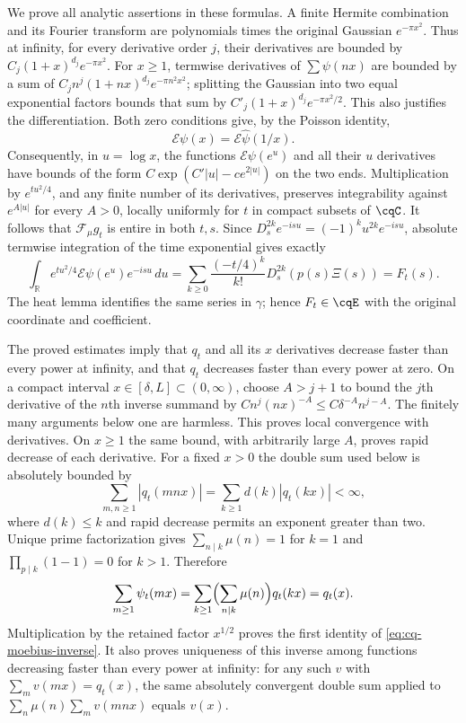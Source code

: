 We prove all analytic assertions in these formulas. A finite Hermite
combination and its Fourier transform are polynomials times the
original Gaussian $e^{-\pi x^2}$. Thus at infinity, for every
derivative order $j$, their derivatives are bounded by
$C_j(1+x)^{d_j}e^{-\pi x^2}$. For $x\geq1$, termwise derivatives
of $\sum\psi(nx)$ are bounded by a sum of
$C_j n^j(1+nx)^{d_j}e^{-\pi n^2x^2}$; splitting the Gaussian
into two equal exponential factors bounds that sum by
$C'_j(1+x)^{d_j}e^{-\pi x^2/2}$. This also justifies the
differentiation. Both zero conditions give, by the Poisson identity,
\[
 \mathcal E\psi(x)=\mathcal E\widehat\psi(1/x).
\]
Consequently, in $u=\log x$, the functions
$\mathcal E\psi(e^u)$ and all their $u$ derivatives have bounds
of the form $C\exp(C'|u|-c e^{2|u|})$ on the two ends.
Multiplication by $e^{tu^2/4}$, and any finite number of its
derivatives, preserves integrability against $e^{A|u|}$ for every
$A>0$, locally uniformly for $t$ in compact subsets of $\cqC$.
It follows that $\mathcal F_\mu g_t$ is entire in both $t,s$.
Since $D_s^{2k}e^{-isu}=(-1)^ku^{2k}e^{-isu}$, absolute
termwise integration of the time exponential gives exactly
\[
 \int_{\mathbb R}e^{tu^2/4}\mathcal E\psi(e^u)e^{-isu}\,du
 =\sum_{k\geq0}\frac{(-t/4)^k}{k!}
       D_s^{2k}(p(s)\Xi(s))=F_t(s).
\]
The heat lemma identifies the same series in $\gamma$; hence
$F_t\in\cqE$ with the original coordinate and coefficient.

The proved estimates imply that $q_t$ and all its $x$ derivatives
decrease faster than every power at infinity, and that $q_t$
decreases faster than every power at zero. On a compact interval
$x\in[\delta,L]\subset(0,\infty)$, choose $A>j+1$ to bound
the $j$th derivative of the $n$th inverse summand by
$C n^j(nx)^{-A}\leq C\delta^{-A}n^{j-A}$.
The finitely many arguments below one are harmless. This proves
local convergence with derivatives. On $x\geq1$ the same bound,
with arbitrarily large $A$, proves rapid decrease of each derivative.
For a fixed $x>0$ the double sum used below is absolutely bounded by
\[
 \sum_{m,n\geq1}|q_t(mnx)|
 =\sum_{k\geq1}d(k)|q_t(kx)|<\infty,
\]
where $d(k)\leq k$ and rapid decrease permits an exponent greater
than two. Unique prime factorization gives
$\sum_{n\mid k}\mu(n)=1$ for $k=1$ and
$\prod_{p\mid k}(1-1)=0$ for $k>1$. Therefore
\[
 \sum_{m\geq1}\psi_t(mx)
 =\sum_{k\geq1}\Bigl(\sum_{n\mid k}\mu(n)\Bigr)q_t(kx)
 =q_t(x).
\]
Multiplication by the retained factor $x^{1/2}$ proves the first
identity of \eqref{eq:cq-moebius-inverse}. It also proves uniqueness
of this inverse among functions decreasing faster than every power
at infinity: for any such $v$ with $\sum_m v(mx)=q_t(x)$, the
same absolutely convergent double sum applied to
$\sum_n\mu(n)\sum_m v(mnx)$ equals $v(x)$.

